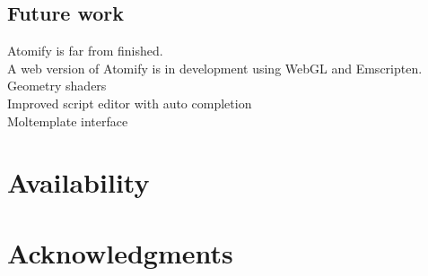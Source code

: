\documentclass[aps,pre,twocolumn,letterpaper,floatfix]{revtex4-1}
\begin{document}
\subsection{Future work}
Atomify is far from finished.\\
A web version of Atomify is in development using WebGL and Emscripten. \\
Geometry shaders \\
Improved script editor with auto completion \\
Moltemplate interface \\

\section{Availability}

\section{Acknowledgments}



\end{document}
